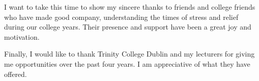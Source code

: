 \documentclass[a4paper,oneside,12pt]{book}
\numberwithin{equation}{chapter} %
\begin{document}
I want to take this time to show my sincere thanks to friends and college friends who have made good company, understanding the times of stress and relief during our college years. Their presence and support have been a great joy and motivation.

Finally, I would like to thank Trinity College Dublin and my lecturers for giving me opportunities over the past four years.
I am appreciative of what they have offered.




\tableofcontents
\listoffigures
\listoftables
\newpage



\mainmatter









%
\nocite{*}


\appendix
\renewcommand{\thechapter}{A\arabic{chapter}}

\end{document}
